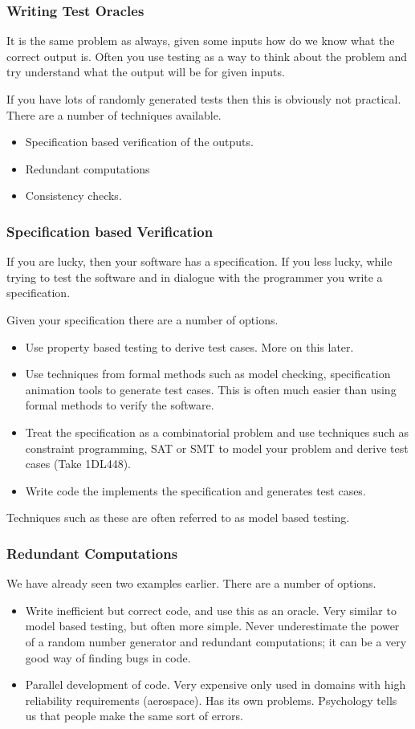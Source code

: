 \documentclass{beamer}
\begin{document}
\begin{frame}
  \frametitle{Writing Test Oracles}
  It is   the same problem as always, given some inputs how do we know what
  the correct output is. Often you use testing as a way to think about the
  problem and try understand what the output will be for given inputs.

  If you have lots of randomly generated tests then this is obviously
  not practical.  There are a number of techniques available. 
  \begin{itemize}
  \item Specification based verification of the outputs.
  \item Redundant computations
  \item Consistency checks.
  \end{itemize}
\end{frame}
\begin{frame}
  \frametitle{Specification based Verification}
  If you are lucky, then your software has a specification. If you less lucky,
 while trying to test the software and in dialogue with the programmer you
 write a specification.

 Given your specification there are a number of options.
  \begin{itemize}
  \item Use property based testing to derive test cases. More on this later.
  \item Use techniques from formal methods such as model checking,
    specification animation tools to generate test cases. This is often much
    easier than using formal methods to verify the software.
  \item Treat the specification as a combinatorial problem and use techniques
    such as constraint programming, SAT or SMT to model your problem and
    derive test cases (Take 1DL448).
  \item Write code the implements the specification and generates test cases.
  \end{itemize}
Techniques such as these are often referred to as model based testing.
\end{frame}
\begin{frame}
  \frametitle{Redundant Computations}
  We have already seen two examples earlier. There are a number of options.
  \begin{itemize}
  \item  Write inefficient but correct code, and  use this as an oracle. Very
    similar to model based testing, but often more simple. Never underestimate
    the power of a random number generator and redundant computations; it can
    be a very good way of finding bugs in code.
  \item Parallel development of code. Very expensive only used in domains with
    high reliability requirements (aerospace). Has its own
    problems. Psychology tells us that people make the same sort of errors.      
  \end{itemize}

\end{frame}
\end{document}
